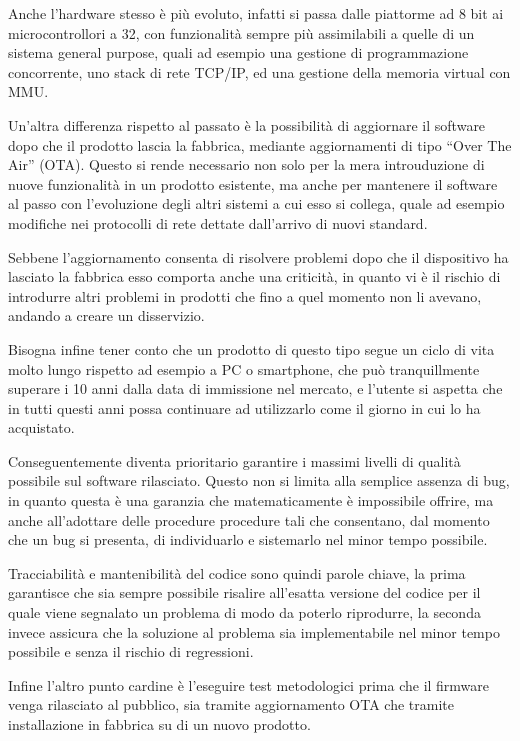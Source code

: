 \documentclass[a4paper,titlepage]{article}
\begin{document}
Anche l'hardware stesso è più evoluto, infatti si passa dalle piattorme ad 8 bit ai 
microcontrollori a 32, con funzionalità sempre più assimilabili a quelle di un sistema 
general purpose, quali ad esempio una gestione di programmazione concorrente, uno 
stack di rete TCP/IP, ed una gestione della memoria virtual con MMU. 

Un'altra differenza rispetto al passato è la possibilità di aggiornare il software dopo 
che il prodotto lascia la fabbrica, mediante aggiornamenti di tipo ``Over The Air'' (OTA). 
Questo si rende necessario non solo per la mera introuduzione di nuove funzionalità in 
un prodotto esistente, ma anche per mantenere il software al passo con l'evoluzione degli 
altri sistemi a cui esso si collega, quale ad esempio modifiche nei protocolli di rete 
dettate dall'arrivo di nuovi standard. 

Sebbene l'aggiornamento consenta di risolvere problemi dopo che il dispositivo ha lasciato la 
fabbrica esso comporta anche una criticità, in quanto vi è il rischio di introdurre altri problemi 
in prodotti che fino a quel momento non li avevano, andando a creare un disservizio. 

Bisogna infine tener conto che un prodotto di questo tipo segue un ciclo di vita molto lungo 
rispetto ad esempio a PC o smartphone, che può tranquillmente superare i 10 anni dalla data di 
immissione nel mercato, e l'utente si aspetta che in tutti questi anni possa continuare ad 
utilizzarlo come il giorno in cui lo ha acquistato. 

Conseguentemente diventa prioritario garantire i massimi livelli di qualità possibile 
sul software rilasciato. Questo non si limita alla semplice assenza di bug, in quanto 
questa è una garanzia che matematicamente è impossibile offrire, ma anche all'adottare 
delle procedure procedure tali che consentano, dal momento che un bug si 
presenta, di individuarlo e sistemarlo nel minor tempo possibile. 

Tracciabilità e mantenibilità del codice sono quindi parole chiave, la prima garantisce che 
sia sempre possibile risalire all'esatta versione del codice per il quale viene segnalato un 
problema di modo da poterlo riprodurre, la seconda invece assicura che la soluzione al problema 
sia implementabile nel minor tempo possibile e senza il rischio di regressioni. 

Infine l'altro punto cardine è l'eseguire test metodologici prima che il firmware venga 
rilasciato al pubblico, sia tramite aggiornamento OTA che tramite installazione in fabbrica 
su di un nuovo prodotto.  
\end{document}
